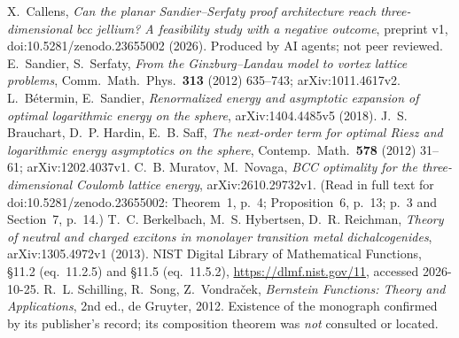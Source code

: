  X.~Callens, \emph{Can the planar Sandier--Serfaty proof architecture reach three-dimensional bcc
jellium? A feasibility study with a negative outcome}, preprint v1, doi\string:10.5281/zenodo.23655002 (2026). Produced by
AI agents; not peer reviewed.
 E.~Sandier, S.~Serfaty, \emph{From the Ginzburg--Landau model to vortex lattice problems}, Comm.\ Math.\
Phys.\ \textbf{313} (2012) 635--743; arXiv:1011.4617v2.
 L.~B\'etermin, E.~Sandier, \emph{Renormalized energy and asymptotic expansion of optimal logarithmic
energy on the sphere}, arXiv:1404.4485v5 (2018).
 J.~S. Brauchart, D.~P. Hardin, E.~B. Saff, \emph{The next-order term for optimal Riesz and logarithmic
energy asymptotics on the sphere}, Contemp.\ Math.\ \textbf{578} (2012) 31--61; arXiv:1202.4037v1.
\bibitem{ch2mn} C.~B. Muratov, M.~Novaga, \emph{BCC optimality for the three-dimensional Coulomb lattice energy}, arXiv:2610.29732v1. (Read in full text for doi\string:10.5281/zenodo.23655002:
Theorem~1, p.~4; Proposition~6, p.~13; p.~3 and Section~7, p.~14.)
\bibitem{ch2bhr} T.~C. Berkelbach, M.~S. Hybertsen, D.~R. Reichman, \emph{Theory of neutral and charged excitons in
monolayer transition metal dichalcogenides}, arXiv:1305.4972v1 (2013).
\bibitem{ch2dlmf} NIST Digital Library of Mathematical Functions, \S11.2 (eq.~11.2.5) and \S11.5 (eq.~11.5.2),
\url{https://dlmf.nist.gov/11}, accessed 2026-10-25.
 R.~L. Schilling, R.~Song, Z.~Vondra\v{c}ek, \emph{Bernstein Functions: Theory and Applications},
2nd ed., de Gruyter, 2012. Existence of the monograph confirmed by its publisher's record; its composition theorem
was \emph{not} consulted or located.
